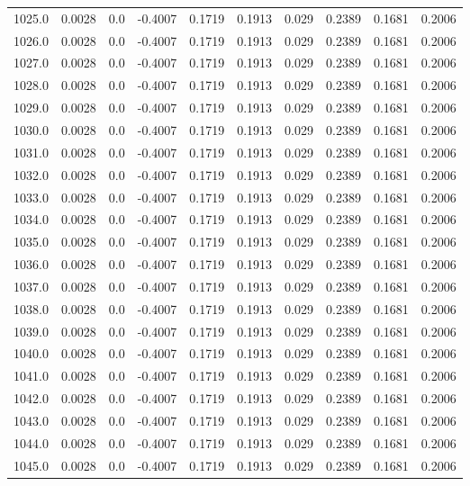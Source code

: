 \begin{longtable}{lrrrrrrrrr}
1025.0 & 0.0028 & 0.0 & -0.4007 & 0.1719 & 0.1913 & 0.029 & 0.2389 & 0.1681 & 0.2006 \\
1026.0 & 0.0028 & 0.0 & -0.4007 & 0.1719 & 0.1913 & 0.029 & 0.2389 & 0.1681 & 0.2006 \\
1027.0 & 0.0028 & 0.0 & -0.4007 & 0.1719 & 0.1913 & 0.029 & 0.2389 & 0.1681 & 0.2006 \\
1028.0 & 0.0028 & 0.0 & -0.4007 & 0.1719 & 0.1913 & 0.029 & 0.2389 & 0.1681 & 0.2006 \\
1029.0 & 0.0028 & 0.0 & -0.4007 & 0.1719 & 0.1913 & 0.029 & 0.2389 & 0.1681 & 0.2006 \\
1030.0 & 0.0028 & 0.0 & -0.4007 & 0.1719 & 0.1913 & 0.029 & 0.2389 & 0.1681 & 0.2006 \\
1031.0 & 0.0028 & 0.0 & -0.4007 & 0.1719 & 0.1913 & 0.029 & 0.2389 & 0.1681 & 0.2006 \\
1032.0 & 0.0028 & 0.0 & -0.4007 & 0.1719 & 0.1913 & 0.029 & 0.2389 & 0.1681 & 0.2006 \\
1033.0 & 0.0028 & 0.0 & -0.4007 & 0.1719 & 0.1913 & 0.029 & 0.2389 & 0.1681 & 0.2006 \\
1034.0 & 0.0028 & 0.0 & -0.4007 & 0.1719 & 0.1913 & 0.029 & 0.2389 & 0.1681 & 0.2006 \\
1035.0 & 0.0028 & 0.0 & -0.4007 & 0.1719 & 0.1913 & 0.029 & 0.2389 & 0.1681 & 0.2006 \\
1036.0 & 0.0028 & 0.0 & -0.4007 & 0.1719 & 0.1913 & 0.029 & 0.2389 & 0.1681 & 0.2006 \\
1037.0 & 0.0028 & 0.0 & -0.4007 & 0.1719 & 0.1913 & 0.029 & 0.2389 & 0.1681 & 0.2006 \\
1038.0 & 0.0028 & 0.0 & -0.4007 & 0.1719 & 0.1913 & 0.029 & 0.2389 & 0.1681 & 0.2006 \\
1039.0 & 0.0028 & 0.0 & -0.4007 & 0.1719 & 0.1913 & 0.029 & 0.2389 & 0.1681 & 0.2006 \\
1040.0 & 0.0028 & 0.0 & -0.4007 & 0.1719 & 0.1913 & 0.029 & 0.2389 & 0.1681 & 0.2006 \\
1041.0 & 0.0028 & 0.0 & -0.4007 & 0.1719 & 0.1913 & 0.029 & 0.2389 & 0.1681 & 0.2006 \\
1042.0 & 0.0028 & 0.0 & -0.4007 & 0.1719 & 0.1913 & 0.029 & 0.2389 & 0.1681 & 0.2006 \\
1043.0 & 0.0028 & 0.0 & -0.4007 & 0.1719 & 0.1913 & 0.029 & 0.2389 & 0.1681 & 0.2006 \\
1044.0 & 0.0028 & 0.0 & -0.4007 & 0.1719 & 0.1913 & 0.029 & 0.2389 & 0.1681 & 0.2006 \\
1045.0 & 0.0028 & 0.0 & -0.4007 & 0.1719 & 0.1913 & 0.029 & 0.2389 & 0.1681 & 0.2006 \\

\end{longtable}
